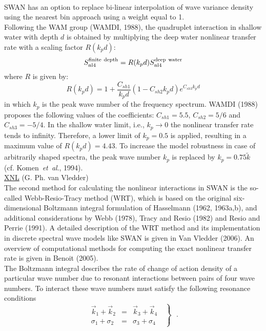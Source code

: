 \documentclass[12pt]{book}
\begin{document}
\\[2ex]
\noindent
SWAN has an option to replace bi-linear interpolation of wave variance density using the
nearest bin approach using a weight equal to 1.
\\[2ex]
\noindent
Following the WAM group (WAMDI, 1988), the quadruplet interaction in shallow water with
depth $d$ is obtained by multiplying the deep water nonlinear transfer rate with a scaling factor
$R(k_pd)$:
\begin{equation}
  S_{\rm nl4}^{\rm finite~depth} = R(k_pd)S_{\rm nl4}^{\rm deep~water}
  \label{eq3-31}
\end{equation}
where $R$ is given by:
\begin{equation}
  R(k_pd) = 1 + \frac{C_{sh1}}{k_pd} (1-C_{sh2}k_pd) e^{C_{sh3}k_pd}
  \label{eq3-32}
\end{equation}
in which $k_p$ is the peak wave number of the frequency spectrum. WAMDI (1988) proposes the
following values of the coefficients:
$C _{sh1}= 5.5$, $C _{sh2} = 5/6$ and $C _{sh3} = -5/4$.
In the shallow water limit, i.e., $k_p \rightarrow 0$ the nonlinear transfer rate tends to infinity. Therefore,
a lower limit of $k_p = 0.5$ is applied, resulting in a maximum value
of $R(k_pd)=4.43$. To increase the model robustness in case of arbitrarily shaped spectra, the peak wave number
$k_p$ is replaced by $k_p = 0.75 \tilde{k}$ (cf. Komen~{\it et~al}., 1994).
\\[2ex]
\noindent
\underline{XNL} \hfill (G. Ph. van Vledder)
\\[2ex]
The second method for calculating the nonlinear interactions in SWAN
is the so-called Webb-Resio-Tracy method (WRT), which is based on the
original six-dimensional Boltzmann integral formulation of
Hasselmann (1962, 1963a,b), and additional considerations by
Webb (1978), Tracy and Resio (1982) and Resio and Perrie (1991).
A detailed description of the WRT method and its implementation in
discrete spectral wave models like SWAN is given in Van Vledder (2006).
An overview of computational methods for computing the exact nonlinear
transfer rate is given in Benoit (2005).
\nocite{Has62,Has63a,Has63b,Web78,Tra82R,Res91P,Vle06,Ben05}
\\[2ex]
\noindent
The Boltzmann integral describes the rate of change of action density
of a particular wave number due to resonant interactions between pairs
of four wave numbers. To interact these wave numbers must satisfy the
following resonance conditions
\begin{equation}
\left .
\begin{array}{ccc}
  \vec{k}_1 + \vec{k}_2 & = & \vec{k}_3 + \vec{k}_4 \\
  \sigma_1 + \sigma_2  & = & \sigma_3 + \sigma_4
\end{array} \:\:\: \right \rbrace \:\:\: .
\label{eq:resonance_2}
\end{equation}
\end{document}
